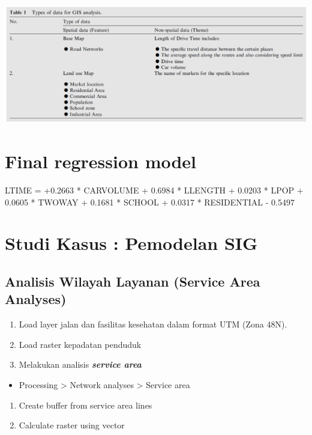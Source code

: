 \documentclass[]{book}
\providecommand{\tightlist}{%
  \setlength{\itemsep}{0pt}\setlength{\parskip}{0pt}}
\begin{document}
\includegraphics{./img/gismodel2.png}

\hypertarget{final-regression-model}{%
\section{Final regression model}\label{final-regression-model}}

LTIME = +0.2663 * CARVOLUME + 0.6984 * LLENGTH + 0.0203 * LPOP + 0.0605 * TWOWAY + 0.1681 * SCHOOL + 0.0317 * RESIDENTIAL - 0.5497

\hypertarget{studi-kasus-pemodelan-sig}{%
\section{Studi Kasus : Pemodelan SIG}\label{studi-kasus-pemodelan-sig}}

\hypertarget{analisis-wilayah-layanan-service-area-analyses}{%
\subsection{Analisis Wilayah Layanan (Service Area Analyses)}\label{analisis-wilayah-layanan-service-area-analyses}}

\begin{enumerate}
\def\labelenumi{\arabic{enumi}.}
\item
  Load layer jalan dan fasilitas kesehatan dalam format UTM (Zona 48N).
\item
  Load raster kepadatan penduduk
\item
  Melakukan analisis \textbf{\emph{service area}}
\end{enumerate}

\begin{itemize}
\tightlist
\item
  Processing \textgreater{} Network analyses \textgreater{} Service area
\end{itemize}

\begin{enumerate}
\def\labelenumi{\arabic{enumi}.}
\setcounter{enumi}{3}
\item
  Create buffer from service area lines
\item
  Calculate raster using vector
\end{enumerate}
\end{document}
